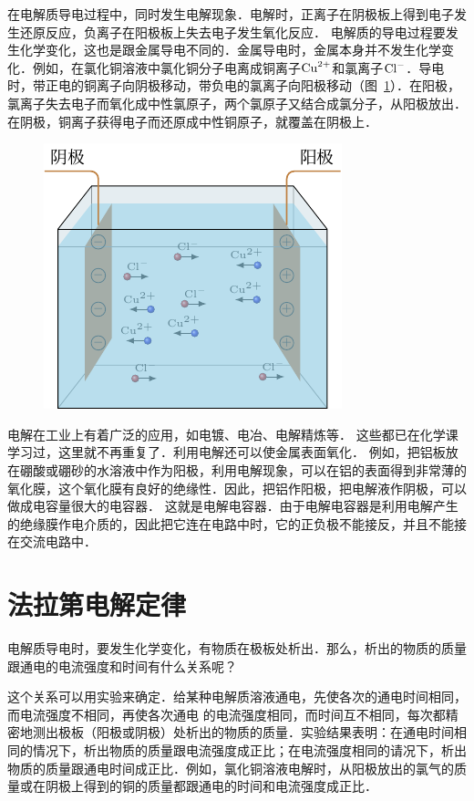 在电解质导电过程中，同时发生电解现象．电解时，正离子在阴极板上得到电子发生还原反应，负离子在阳极板上失去电子发生氧化反应．
电解质的导电过程要发生化学变化，这也是跟金属导电不同的．金属导电时，金属本身并不发生化学变化．例如，在氯化铜溶液中氯化铜分子电离成铜离子${\rm Cu}^{2+}$和氯离子${\rm Cl}^-$．导电时，带正电的铜离子向阴极移动，带负电的氯离子向阳极移动（图~\ref{fig_B_8-3}）．在阳极，氯离子失去电子而氧化成中性氯原子，两个氯原子又结合成氯分子，从阳极放出．在阴极，铜离子获得电子而还原成中性铜原子，就覆盖在阴极上．
\begin{figure}[htbp]
    \centering
    \includegraphics{fig/B/8-3.pdf}
    \caption{}\label{fig_B_8-3}
\end{figure}

电解在工业上有着广泛的应用，如电镀、电冶、电解精炼等．
这些都已在化学课学习过，这里就不再重复了．利用电解还可以使金属表面氧化．
例如，把铝板放在硼酸或硼砂的水溶液中作为阳极，利用电解现象，可以在铝的表面得到非常薄的氧化膜，这个氧化膜有良好的绝缘性．因此，把铝作阳极，把电解液作阴极，可以做成电容量很大的电容器．
这就是电解电容器．由于电解电容器是利用电解产生的绝缘膜作电介质的，因此把它连在电路中时，它的正负极不能接反，并且不能接在交流电路中．

\section{法拉第电解定律}
电解质导电时，要发生化学变化，有物质在极板处析出．那么，析出的物质的质量跟通电的电流强度和时间有什么关系呢？

这个关系可以用实验来确定．给某种电解质溶液通电，先使各次的通电时间相同，而电流强度不相同，再使各次通电
的电流强度相同，而时间互不相同，每次都精密地测出极板（阳极或阴极）处析出的物质的质量．实验结果表明：在通电时间相同的情况下，析出物质的质量跟电流强度成正比；在电流强度相同的请况下，析出物质的质量跟通电时间成正比．例如，氯化铜溶液电解时，从阳极放出的氯气的质量或在阴极上得到的铜的质量都跟通电的时间和电流强度成正比．

